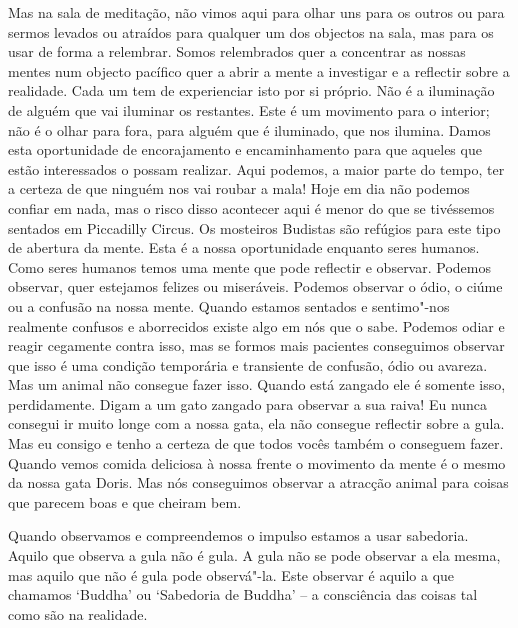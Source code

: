 Mas na sala de meditação, não vimos aqui para olhar uns para os outros
ou para sermos levados ou atraídos para qualquer um dos objectos na
sala, mas para os usar de forma a relembrar. Somos relembrados quer a
concentrar as nossas mentes num objecto pacífico quer a abrir a mente a
investigar e a reflectir sobre a realidade. Cada um tem de experienciar
isto por si próprio. Não é a iluminação de alguém que vai iluminar os
restantes. Este é um movimento para o interior; não é o olhar para fora,
para alguém que é iluminado, que nos ilumina. Damos esta oportunidade de
encorajamento e encaminhamento para que aqueles que estão interessados o
possam realizar. Aqui podemos, a maior parte do tempo, ter a certeza de
que ninguém
nos vai roubar a mala! Hoje em dia não podemos confiar em
nada, mas o risco disso acontecer aqui é menor do que se tivéssemos
sentados em Piccadilly Circus. Os mosteiros Budistas são refúgios para
este tipo de abertura da mente. Esta é a nossa oportunidade enquanto
seres humanos. Como seres humanos temos uma mente que pode reflectir e
observar. Podemos observar, quer estejamos felizes ou miseráveis.
Podemos observar o ódio, o ciúme ou a confusão na nossa mente. Quando
estamos sentados e sentimo"-nos realmente confusos e aborrecidos existe
algo em nós que o sabe. Podemos odiar e reagir cegamente contra isso,
mas se formos mais pacientes conseguimos observar que isso é uma
condição temporária e transiente de confusão, ódio ou avareza. Mas um
animal não consegue fazer isso. Quando está zangado ele é somente isso,
perdidamente. Digam a um gato zangado para observar a sua raiva! Eu
nunca consegui ir muito longe com a nossa gata, ela não consegue
reflectir sobre a gula. Mas eu consigo e tenho a certeza de que todos
vocês também o conseguem fazer. Quando vemos comida deliciosa à nossa
frente o movimento da mente é o mesmo da nossa gata Doris. Mas nós
conseguimos observar a atracção animal para coisas que parecem boas e
que cheiram bem.

Quando observamos e compreendemos o impulso estamos a usar sabedoria.
Aquilo que observa a gula não é gula. A gula não se pode observar a ela
mesma, mas aquilo que não é gula pode observá"-la. Este observar é aquilo
a que chamamos `Buddha' ou
`Sabedoria de Buddha' -- a consciência das coisas tal como são na
realidade.